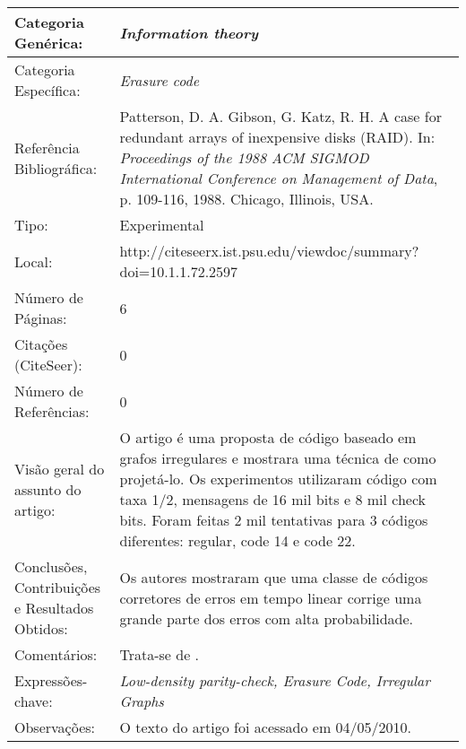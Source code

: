 \documentclass[10pt,a4paper]{article}
\begin{document}
\begin{center}
\begin{tabular}{|p{5cm}||p{10cm}|}
\hline

Categoria Genérica: & \emph{Information theory}\\\hline
Categoria Específica: & \emph{Erasure code}\\\hline
Referência Bibliográfica: & Patterson, D. A. Gibson, G. Katz, R. H. A case for redundant arrays of inexpensive disks (RAID). In:  \emph{Proceedings of the 1988 ACM SIGMOD International Conference on Management of Data}, p. 109-116, 1988. Chicago, Illinois, USA. \\\hline
Tipo: & Experimental\\\hline
Local: & http://citeseerx.ist.psu.edu/viewdoc/summary?doi=10.1.1.72.2597\\\hline
Número de Páginas: & 6\\\hline
Citações (CiteSeer): & 0\\\hline
Número de Referências: & 0\\\hline
Visão geral do assunto do artigo: & O artigo é uma proposta de código baseado em grafos irregulares e mostrara uma técnica de como projetá-lo. Os experimentos utilizaram código com taxa 1/2, mensagens de 16 mil bits e 8 mil check bits. Foram feitas 2 mil tentativas para 3 códigos diferentes: regular, code 14 e code 22. \\\hline
Conclusões, Contribuições e Resultados Obtidos: &  Os autores mostraram que uma classe de códigos corretores de erros em tempo linear corrige uma grande parte dos erros com alta probabilidade. \\\hline
Comentários: & Trata-se de . \\\hline
Expressões-chave: & \emph{Low-density parity-check, Erasure Code, Irregular Graphs}\\\hline
Observações: &  O texto do artigo foi acessado em 04/05/2010.\\\hline

\end{tabular}
\end{center}
\end{document}
